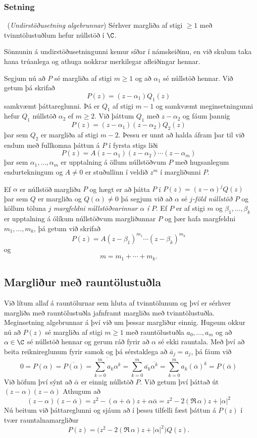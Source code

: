 \subsubsection{Setning} \  ({\it Undirstöðusetning
algebrunnar})   Sérhver margliða af stigi $\geq 1$
með tvinntölustuðlum hefur  núllstöð í $\C$.  


\bigskip
Sönnunin á undirstöðusetningunni  kemur síðar í námskeiðinu, en við 
skulum taka hana  trúanlega  og athuga nokkrar merkilegar
afleiðingar hennar.   


Segjum nú að $P$  sé margliða af stigi $m\geq 1$
og að $\alpha_1$ sé núllstöð hennar.  Við getum þá skrifað
$$
P(z)=(z-\alpha_1)Q_1(z)
$$
samkvæmt þáttareglunni.  Þá er $Q_1$ af stigi $m-1$ og 
samkvæmt meginsetningunni hefur $Q_1$
núllstöð $\alpha_2$ ef $m\geq 2$. Við þáttum $Q_1$ með $z-\alpha_2$ og fáum þannig
$$
P(z)=(z-\alpha_1)(z-\alpha_2)Q_2(z)
$$ þar sem $Q_2$ er margliða af stigi
$m-2$.  Þessu er unnt að halda áfram þar til við endum með fullkomna
þáttun á $P$ í fyrsta stigs liði
$$
P(z)=A(z-\alpha_1)(z-\alpha_2)\cdots(z-\alpha_m)
$$
þar sem $\alpha_1,\dots,\alpha_m$ er upptalning á öllum núllstöðvum $P$
með hugsanlegum endurtekningum og $A\neq 0$ er stuðullinn í veldið
$z^m$ í margliðunni $P$.

Ef $\alpha$ er núllstöð margliðu $P$ og hægt er að þátta $P$
í $P(z)=(z-\alpha)^jQ(z)$ þar sem $Q$ er margliða og $Q(\alpha)\neq 0$
þá segjum við að $\alpha$ sé {\it $j$-föld núllstöð $P$} og köllum töluna
$j$ {\it margfeldni núllstöðvarinnar $\alpha$ í $P$}.  Ef $P$ er af
stigi $m$ og $\beta_1,\dots,\beta_k$ er upptalning á ólíkum
núllstöðvum margliðunnar $P$ og þær hafa margfeldni $m_1,\dots,m_k$,
þá getum við skrifað 
$$
P(z)=A(z-\beta_1)^{m_1}\cdots(z-\beta_k)^{m_k}
$$
og 
$$
m=m_1+\cdots+m_k.
$$


\subsection*{Margliður með rauntölustuðla}

Við lítum allaf á rauntölurnar sem hluta af tvinntölunum og því er
sérhver margliða með rauntölustuðla jafnframt margliða með
tvinntölustuðla.  Meginsetning algebrunnar á því við um þessar
margliður einnig. Hugsum okkur nú að  $P(z)$ sé margliða af stigi
$m\geq 1$ með rauntölustuðla $a_0,\dots,a_m$ og að $\alpha\in \C$ sé
núllstöð hennar og gerum ráð fyrir að $\alpha$ sé ekki rauntala.  
Með því að beita reiknireglunum fyrir samok og þá sérstaklega að 
$\bar a_j=a_j$, þá fáum við
\begin{equation*}
0=P(\alpha)=\overline{P(\alpha)}
=\overline{\sum_{k=0}^ma_k\alpha^k} =\sum_{k=0}^m \overline{a_k}\overline{\alpha^k}
=\sum_{k=0}^m a_k (\overline{\alpha})^k=P(\bar\alpha)
\end{equation*}
Við höfum því sýnt að $\bar \alpha$ er einnig núllstöð $P$. 
Við getum því þáttað út $(z-\alpha)(z-\bar \alpha)$
Athugum að 
$$
(z-\alpha)(z-\bar\alpha)=
z^2-(\alpha+\bar\alpha)z+\alpha\bar\alpha
=z^2-2(\Re\, \alpha)z+|\alpha|^2
$$
Nú beitum við þáttareglunni og sjáum að í þessu tilfelli fæst 
þáttun á $P(z)$ í tvær rauntalnamargliður
$$
P(z)=\big(z^2-2(\Re\, \alpha)z+|\alpha|^2\big)Q(z).
$$



